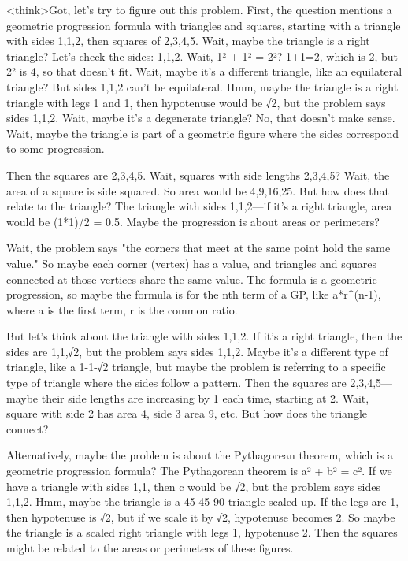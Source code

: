 <think>Got, let's try to figure out this problem. First, the question mentions a geometric progression formula with triangles and squares, starting with a triangle with sides 1,1,2, then squares of 2,3,4,5. Wait, maybe the triangle is a right triangle? Let's check the sides: 1,1,2. Wait, 1² + 1² = 2²? 1+1=2, which is 2, but 2² is 4, so that doesn't fit. Wait, maybe it's a different triangle, like an equilateral triangle? But sides 1,1,2 can't be equilateral. Hmm, maybe the triangle is a right triangle with legs 1 and 1, then hypotenuse would be √2, but the problem says sides 1,1,2. Wait, maybe it's a degenerate triangle? No, that doesn't make sense. Wait, maybe the triangle is part of a geometric figure where the sides correspond to some progression.

Then the squares are 2,3,4,5. Wait, squares with side lengths 2,3,4,5? Wait, the area of a square is side squared. So area would be 4,9,16,25. But how does that relate to the triangle? The triangle with sides 1,1,2—if it's a right triangle, area would be (1*1)/2 = 0.5. Maybe the progression is about areas or perimeters?

Wait, the problem says "the corners that meet at the same point hold the same value." So maybe each corner (vertex) has a value, and triangles and squares connected at those vertices share the same value. The formula is a geometric progression, so maybe the formula is for the nth term of a GP, like a*r^(n-1), where a is the first term, r is the common ratio.

But let's think about the triangle with sides 1,1,2. If it's a right triangle, then the sides are 1,1,√2, but the problem says sides 1,1,2. Maybe it's a different type of triangle, like a 1-1-√2 triangle, but maybe the problem is referring to a specific type of triangle where the sides follow a pattern. Then the squares are 2,3,4,5—maybe their side lengths are increasing by 1 each time, starting at 2. Wait, square with side 2 has area 4, side 3 area 9, etc. But how does the triangle connect?

Alternatively, maybe the problem is about the Pythagorean theorem, which is a geometric progression formula? The Pythagorean theorem is a² + b² = c². If we have a triangle with sides 1,1, then c would be √2, but the problem says sides 1,1,2. Hmm, maybe the triangle is a 45-45-90 triangle scaled up. If the legs are 1, then hypotenuse is √2, but if we scale it by √2, hypotenuse becomes 2. So maybe the triangle is a scaled right triangle with legs 1, hypotenuse 2. Then the squares might be related to the areas or perimeters of these figures.

